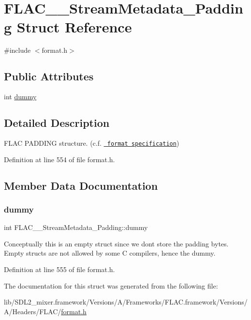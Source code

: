 \hypertarget{struct_f_l_a_c_____stream_metadata___padding}{}\section{F\+L\+A\+C\+\_\+\+\_\+\+Stream\+Metadata\+\_\+\+Padding Struct Reference}
\label{struct_f_l_a_c_____stream_metadata___padding}


{\ttfamily \#include $<$format.\+h$>$}

\subsection*{Public Attributes}
\begin{DoxyCompactItemize}
\item 
int \mbox{\hyperlink{struct_f_l_a_c_____stream_metadata___padding_a5214437fcba7d6abdc3b2435dcaa4124}{dummy}}
\end{DoxyCompactItemize}


\subsection{Detailed Description}
F\+L\+AC P\+A\+D\+D\+I\+NG structure. (c.\+f. \href{../format.html\#metadata_block_padding}{\texttt{ format specification}}) 

Definition at line 554 of file format.\+h.



\subsection{Member Data Documentation}
\mbox{\label{struct_f_l_a_c_____stream_metadata___padding_a5214437fcba7d6abdc3b2435dcaa4124}} 
\subsubsection{\texorpdfstring{dummy}{dummy}}
{\footnotesize\ttfamily int F\+L\+A\+C\+\_\+\+\_\+\+Stream\+Metadata\+\_\+\+Padding\+::dummy}

Conceptually this is an empty struct since we don\textquotesingle{}t store the padding bytes. Empty structs are not allowed by some C compilers, hence the dummy. 

Definition at line 555 of file format.\+h.



The documentation for this struct was generated from the following file\+:\begin{DoxyCompactItemize}
\item 
lib/\+S\+D\+L2\+\_\+mixer.\+framework/\+Versions/\+A/\+Frameworks/\+F\+L\+A\+C.\+framework/\+Versions/\+A/\+Headers/\+F\+L\+A\+C/\mbox{\hyperlink{format_8h}{format.\+h}}\end{DoxyCompactItemize}
